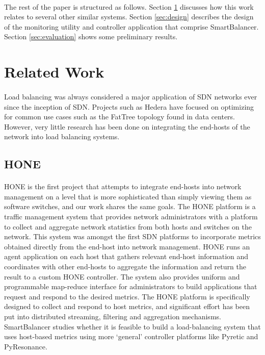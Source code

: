 \documentclass[10pt]{article}
\begin{document}
\paragraph{} The rest of the paper is structured as follows. Section \ref{sec:related} discusses how this work relates to several other similar systems. Section \ref{sec:design} describes the design of the monitoring utility and controller application that comprise SmartBalancer. Section \ref{sec:evaluation} shows some preliminary results.

\section{Related Work}
\label{sec:related}

\paragraph{} Load balancing was always considered a major application of SDN networks ever since the inception of SDN. Projects such as Hedera \cite{Hedera} have focused on optimizing for common use cases such as the FatTree topology found in data centers. However, very little research has been done on integrating the end-hosts of the network into load balancing systems.



\subsection{HONE}

\paragraph{} HONE\cite{HONE} is the first project that attempts to integrate end-hosts into network management on a level that is more sophisticated than simply viewing them as software switches, and our work shares the same goals. The HONE platform is a traffic management system that provides network administrators with a platform to collect and aggregate network statistics from both hosts and switches on the network. This system was amongst the first SDN platforms to incorporate metrics obtained directly from the end-host into network management. HONE runs an agent application on each host that gathers relevant end-host information and coordinates with other end-hosts to aggregate the information and return the result to a custom HONE controller. The system also provides uniform and programmable map-reduce interface for administrators to build applications that request and respond to the desired metrics. The HONE platform is specifically designed to collect and respond to host metrics, and significant effort has been put into distributed streaming, filtering and aggregation mechanisms. SmartBalancer studies whether it is feasible to build a load-balancing system that uses host-based metrics using more ‘general’ controller platforms like Pyretic\cite{Pyretic} and PyResonance\cite{PyResonance}.
\end{document}
